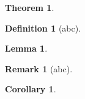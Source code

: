 \documentclass{article}
\theoremstyle{definition}
\newtheorem*{theo}{Theorem}
\newtheorem*{defi}{Definition}
\newtheorem*{lem}{Lemma}
\newtheorem*{rem}{Remark}
\newtheorem*{col}{Corollary}
\begin{document}
\begin{theo}
\lipsum[1]
\end{theo}

\lipsum[1]

\begin{defi}[abc]
\lipsum[1]
\end{defi}

\lipsum[1]

\begin{lem}
\lipsum[1]
\end{lem}

\lipsum[1]

\begin{rem}[abc]
\lipsum[1]
\end{rem}

\lipsum[1]

\begin{col}
\lipsum[1]
\end{col}
\end{document}
